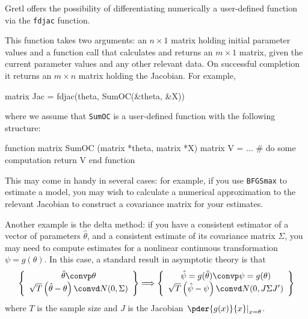 Gretl offers the possibility of differentiating numerically a
user-defined function via the \texttt{fdjac} function.

This function takes two arguments: an $n \times 1$ matrix holding
initial parameter values and a function call that calculates and
returns an $m \times 1$ matrix, given the current parameter values and
any other relevant data.  On successful completion it returns an $m
\times n$ matrix holding the Jacobian.  For example,
%
\begin{code}
matrix Jac = fdjac(theta, SumOC(&theta, &X))
\end{code}
where we assume that \texttt{SumOC} is a user-defined function with
the following structure:
%
\begin{code}
function matrix SumOC (matrix *theta, matrix *X)
  matrix V = ...  # do some computation
  return V
end function
\end{code}

This may come in handy in several cases: for example, if you use
\texttt{BFGSmax} to estimate a model, you may wish to calculate a
numerical approximation to the relevant Jacobian to construct a
covariance matrix for your estimates.

Another example is the delta method: if you have a consistent
estimator of a vector of parameters $\hat{\theta}$, and a consistent
estimate of its covariance matrix $\Sigma$, you may need to compute
estimates for a nonlinear continuous transformation $\psi =
g(\theta)$. In this case, a standard result in asymptotic theory is
that
\[
\left\{
    \begin{array}{c}
      \hat{\theta} \convp \theta \\ 
      \sqrt{T} \left( \hat{\theta} - \theta \right) \convd N(0, \Sigma)
    \end{array}
\right\}
    \Longrightarrow
\left\{
    \begin{array}{c}
      \hat{\psi} = g(\hat{\theta}) \convp \psi = g(\theta) \\ 
      \sqrt{T} \left( \hat{\psi} - \psi \right) \convd N(0, J
      \Sigma J')
    \end{array}
\right\}
\]
where $T$ is the sample size and $J$ is the Jacobian
$\left.\pder{g(x)}{x}\right|_{x = \theta}$.


